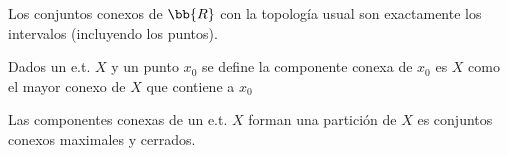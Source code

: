 \begin{teo}
    Los conjuntos conexos de $\bb{R}$ con la topología usual son exactamente los intervalos (incluyendo los puntos).
\end{teo}

\begin{definicion}
    Dados un e.t. $X$ y un punto $x_0$ se define la componente conexa de $x_0$ es $X$ como el mayor conexo de $X$ que contiene a $x_0$
\end{definicion}

\begin{teo}
    Las componentes conexas de un e.t. $X$ forman una partición de $X$ es conjuntos conexos maximales y cerrados.
\end{teo}